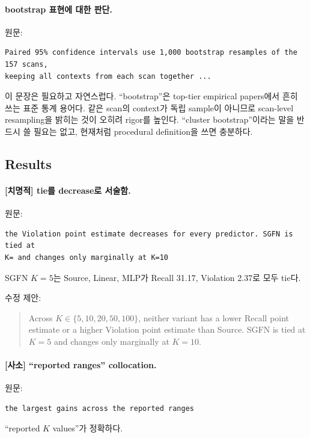 \documentclass[11pt]{article}
\newcommand{\fatal}{\textbf{\textcolor{fatalred}{[치명적]}}}
\newcommand{\minor}{\textbf{\textcolor{minorblue}{[사소]}}}
\begin{document}
\paragraph{bootstrap 표현에 대한 판단.}

원문:
\begin{verbatim}
Paired 95% confidence intervals use 1,000 bootstrap resamples of the 157 scans,
keeping all contexts from each scan together ...
\end{verbatim}

이 문장은 필요하고 자연스럽다. ``bootstrap''은 top-tier empirical papers에서 흔히
쓰는 표준 통계 용어다. 같은 scan의 context가 독립 sample이 아니므로 scan-level
resampling을 밝히는 것이 오히려 rigor를 높인다. ``cluster bootstrap''이라는 말을
반드시 쓸 필요는 없고, 현재처럼 procedural definition을 쓰면 충분하다.

\subsection{Results}

\paragraph{\fatal{} tie를 decrease로 서술함.}

원문:
\begin{verbatim}
the Violation point estimate decreases for every predictor. SGFN is tied at
K= and changes only marginally at K=10
\end{verbatim}

SGFN $K=5$는 Source, Linear, MLP가 Recall 31.17, Violation 2.37로 모두 tie다.

수정 제안:
\begin{quote}
Across $K\in\{5,10,20,50,100\}$, neither variant has a lower Recall point
estimate or a higher Violation point estimate than Source. SGFN is tied at
$K=5$ and changes only marginally at $K=10$.
\end{quote}

\paragraph{\minor{} ``reported ranges'' collocation.}

원문:
\begin{verbatim}
the largest gains across the reported ranges
\end{verbatim}

``reported $K$ values''가 정확하다.
\end{document}
